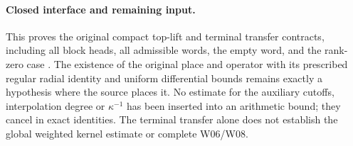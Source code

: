 \paragraph{Closed interface and remaining input.}
This proves the original compact top-lift and terminal
transfer contracts, including all block heads, all admissible
words, the empty word, and the rank-zero case
\cite{terminal-transfer-source}.  The existence of the
original place and operator with its prescribed regular
radial identity and uniform differential bounds remains
exactly a hypothesis where the source places it.  No estimate
for the auxiliary cutoffs, interpolation degree or
$\kappa^{-1}$ has been inserted into an arithmetic bound;
they cancel in exact identities.  The terminal transfer
alone does not establish the global weighted kernel estimate
or complete W06/W08.
